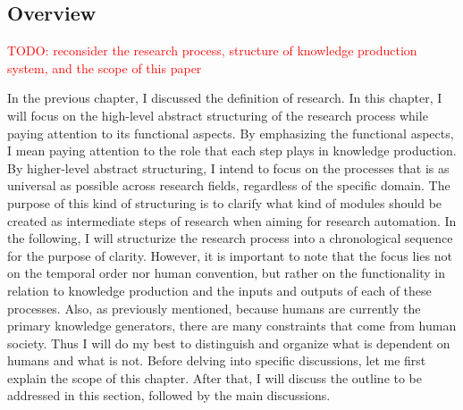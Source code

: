 \documentclass{book}
\begin{document}



\subsection{Overview}

\textcolor{red}{TODO: reconsider the research process, structure of knowledge production system, and the scope of this paper}

In the previous chapter, I discussed the definition of research. In this chapter, I will focus on the high-level abstract structuring of the research process while paying attention to its functional aspects. By emphasizing the functional aspects, I mean paying attention to the role that each step plays in knowledge production. By higher-level abstract structuring, I intend to focus on the processes that is as universal as possible across research fields, regardless of the specific domain. The purpose of this kind of structuring is to clarify what kind of modules should be created as intermediate steps of research when aiming for research automation. In the following, I will structurize the research process into a chronological sequence for the purpose of clarity. However, it is important to note that the focus lies not on the temporal order nor human convention, but rather on the functionality in relation to knowledge production and the inputs and outputs of each of these processes. Also, as previously mentioned, because humans are currently the primary knowledge generators, there are many constraints that come from human society. Thus I will do my best to distinguish and organize what is dependent on humans and what is not. Before delving into specific discussions, let me first explain the scope of this chapter. After that, I will discuss the outline to be addressed in this section, followed by the main discussions.
\end{document}
